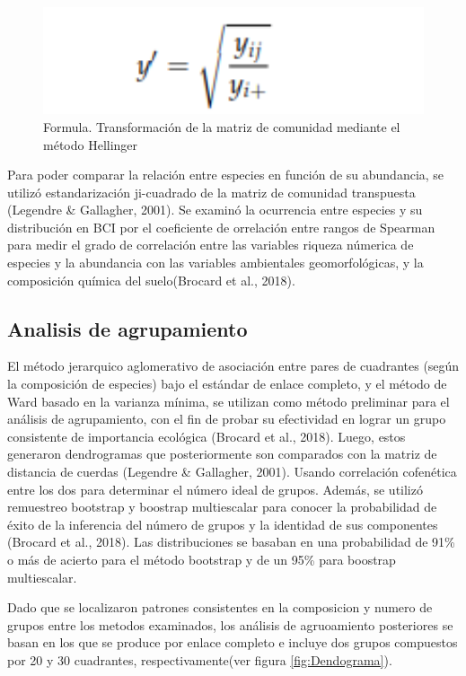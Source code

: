 \documentclass[11pt,]{article}
\begin{document}
\begin{figure}
\centering
\includegraphics[width=1.00000\textwidth]{Formula2.png}
\caption{Formula. Transformación de la matriz de comunidad mediante el
método Hellinger \label{fig:formula}}
\end{figure}

Para poder comparar la relación entre especies en función de su
abundancia, se utilizó estandarización ji-cuadrado de la matriz de
comunidad transpuesta (Legendre \& Gallagher, 2001). Se examinó la
ocurrencia entre especies y su distribución en BCI por el coeficiente de
orrelación entre rangos de Spearman para medir el grado de correlación
entre las variables riqueza númerica de especies y la abundancia con las
variables ambientales geomorfológicas, y la composición química del
suelo(Brocard et al., 2018).

\subsection{Analisis de agrupamiento}\label{analisis-de-agrupamiento}

El método jerarquico aglomerativo de asociación entre pares de
cuadrantes (según la composición de especies) bajo el estándar de enlace
completo, y el método de Ward basado en la varianza mínima, se utilizan
como método preliminar para el análisis de agrupamiento, con el fin de
probar su efectividad en lograr un grupo consistente de importancia
ecológica (Brocard et al., 2018). Luego, estos generaron dendrogramas
que posteriormente son comparados con la matriz de distancia de cuerdas
(Legendre \& Gallagher, 2001). Usando correlación cofenética entre los
dos para determinar el número ideal de grupos. Además, se utilizó
remuestreo bootstrap y boostrap multiescalar para conocer la
probabilidad de éxito de la inferencia del número de grupos y la
identidad de sus componentes (Brocard et al., 2018). Las distribuciones
se basaban en una probabilidad de 91\% o más de acierto para el método
bootstrap y de un 95\% para boostrap multiescalar.

Dado que se localizaron patrones consistentes en la composicion y numero
de grupos entre los metodos examinados, los análisis de agruoamiento
posteriores se basan en los que se produce por enlace completo e incluye
dos grupos compuestos por 20 y 30 cuadrantes, respectivamente(ver figura
\ref{fig:Dendograma}).
\end{document}
